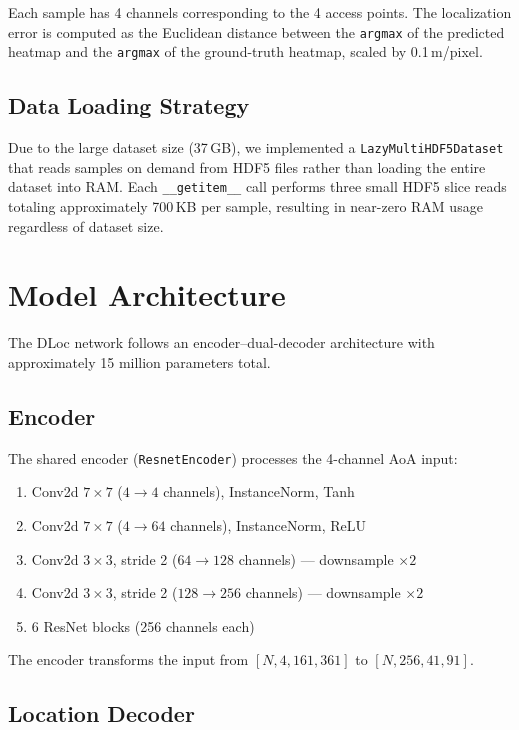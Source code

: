 \documentclass[12pt,a4paper]{article}
\begin{document}
Each sample has 4 channels corresponding to the 4 access points. The localization error is computed as the Euclidean distance between the \texttt{argmax} of the predicted heatmap and the \texttt{argmax} of the ground-truth heatmap, scaled by 0.1\,m/pixel.

\subsection{Data Loading Strategy}

Due to the large dataset size (37\,GB), we implemented a \texttt{LazyMultiHDF5Dataset} that reads samples on demand from HDF5 files rather than loading the entire dataset into RAM. Each \texttt{\_\_getitem\_\_} call performs three small HDF5 slice reads totaling approximately 700\,KB per sample, resulting in near-zero RAM usage regardless of dataset size.

\section{Model Architecture}

The DLoc network follows an encoder--dual-decoder architecture with approximately 15 million parameters total.

\subsection{Encoder}

The shared encoder (\texttt{ResnetEncoder}) processes the 4-channel AoA input:

\begin{enumerate}[nosep]
    \item Conv2d $7 \times 7$ ($4 \to 4$ channels), InstanceNorm, Tanh
    \item Conv2d $7 \times 7$ ($4 \to 64$ channels), InstanceNorm, ReLU
    \item Conv2d $3 \times 3$, stride 2 ($64 \to 128$ channels) --- downsample $\times 2$
    \item Conv2d $3 \times 3$, stride 2 ($128 \to 256$ channels) --- downsample $\times 2$
    \item 6 ResNet blocks (256 channels each)
\end{enumerate}

The encoder transforms the input from $[N, 4, 161, 361]$ to $[N, 256, 41, 91]$.

\subsection{Location Decoder}
\end{document}

